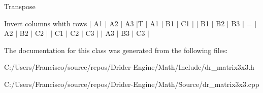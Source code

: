 Transpose

Invert columns whith rows $\vert$ A1 $\vert$ A2 $\vert$ A3 $\vert$T $\vert$ A1 $\vert$ B1 $\vert$ C1 $\vert$ $\vert$ B1 $\vert$ B2 $\vert$ B3 $\vert$ = $\vert$ A2 $\vert$ B2 $\vert$ C2 $\vert$ $\vert$ C1 $\vert$ C2 $\vert$ C3 $\vert$ $\vert$ A3 $\vert$ B3 $\vert$ C3 $\vert$ 

The documentation for this class was generated from the following files\+:\begin{DoxyCompactItemize}
\item 
C\+:/\+Users/\+Francisco/source/repos/\+Drider-\/\+Engine/\+Math/\+Include/dr\+\_\+matrix3x3.\+h\item 
C\+:/\+Users/\+Francisco/source/repos/\+Drider-\/\+Engine/\+Math/\+Source/dr\+\_\+matrix3x3.\+cpp\end{DoxyCompactItemize}
